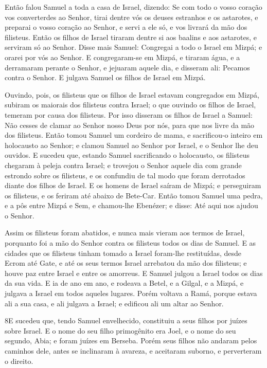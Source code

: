 Então falou Samuel a toda a casa de Israel, dizendo: Se com todo o
vosso coração vos converterdes ao Senhor, tirai dentre vós os deuses
estranhos e os astarotes, e preparai o vosso coração ao Senhor, e
servi a ele só, e vos livrará da mão dos filisteus. Então os
filhos de Israel tiraram dentre si aos baalins e aos astarotes, e
serviram só ao Senhor. Disse mais Samuel: Congregai a todo o
Israel em Mizpá; e orarei por vós ao Senhor. E congregaram-se em
Mizpá, e tiraram água, e a derramaram perante o Senhor, e jejuaram
aquele dia, e disseram ali: Pecamos contra o Senhor. E julgava
Samuel os filhos de Israel em Mizpá.

Ouvindo, pois, os filisteus que os filhos de Israel estavam
congregados em Mizpá, subiram os maiorais dos filisteus contra
Israel; o que ouvindo os filhos de Israel, temeram por causa dos
filisteus. Por isso disseram os filhos de Israel a Samuel: Não
cesses de clamar ao Senhor nosso Deus por nós, para que nos livre da
mão dos filisteus. Então tomou Samuel um cordeiro de mama, e
sacrificou-o inteiro em holocausto ao Senhor; e clamou Samuel ao
Senhor por Israel, e o Senhor lhe deu ouvidos. E sucedeu que,
estando Samuel sacrificando o holocausto, os filisteus chegaram à
peleja contra Israel; e trovejou o Senhor aquele dia com grande
estrondo sobre os filisteus, e os confundiu de tal modo que foram
derrotados diante dos filhos de Israel. E os homens de Israel
saíram de Mizpá; e perseguiram os filisteus, e os feriram até abaixo
de Bete-Car. Então tomou Samuel uma pedra, e a pôs entre
Mizpá e Sem, e chamou-lhe Ebenézer; e disse: Até aqui nos ajudou o
Senhor.

Assim os filisteus foram abatidos, e nunca mais vieram aos termos
de Israel, porquanto foi a mão do Senhor contra os filisteus todos
os dias de Samuel. E as cidades que os filisteus tinham
tomado a Israel foram-lhe restituídas, desde Ecrom até Gate, e até
os seus termos Israel arrebatou da mão dos filisteus; e houve paz
entre Israel e entre os amorreus. E Samuel julgou a Israel
todos os dias da sua vida. E ia de ano em ano, e rodeava a
Betel, e a Gilgal, e a Mizpá, e julgava a Israel em todos aqueles
lugares. Porém voltava a Ramá, porque estava ali a sua casa,
e ali julgava a Israel; e edificou ali um altar ao Senhor.

\medskip

\lettrine{8} E sucedeu que, tendo Samuel envelhecido,
constituiu a seus filhos por juízes sobre Israel. E o nome do
seu filho primogênito era Joel, e o nome do seu segundo, Abia; e
foram juízes em Berseba. Porém seus filhos não andaram pelos
caminhos dele, antes se inclinaram à avareza, e aceitaram suborno, e
perverteram o direito.

